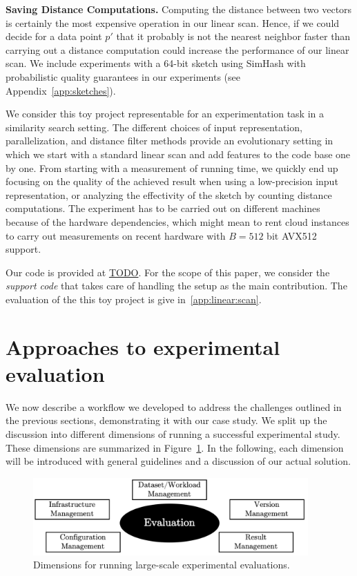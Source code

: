 \documentclass{llncs}
\newcommand{\myparagraph}[1]{\noindent \textbf{#1}}
\begin{document}
\myparagraph{Saving Distance Computations.} Computing the distance 
between two vectors is certainly the most expensive operation in our linear scan. 
Hence, if we could decide for a data point $p'$ that it probably is not the nearest neighbor faster than carrying out a distance computation could increase the performance of our linear scan. 
We include experiments with a 64-bit sketch using SimHash with probabilistic quality guarantees in our experiments (see Appendix~\ref{app:sketches}).

\medskip

We consider this toy project representable for an experimentation task in a similarity search setting. 
The different choices of input representation, parallelization, and distance filter methods provide an evolutionary setting in which we start with a standard linear scan and add features to the code base one by one. 
From starting with a measurement of running time, we quickly end up focusing on the quality of the achieved result when using a low-precision input representation, or analyzing the effectivity of the sketch by counting distance computations.
The experiment has to be carried out on different machines because of the hardware dependencies, which might mean to rent cloud instances to carry out measurements on recent hardware with $B = 512$ bit AVX512 support. 

Our code is provided at \url{TODO}. For the scope of this paper, we consider the \emph{support code} that takes care of handling the setup as the main contribution. The evaluation of the this toy project is give in~\ref{app:linear:scan}.

\section{Approaches to experimental evaluation}
We now describe a workflow we developed to address the challenges outlined
in the previous sections, demonstrating it with our case study.
We split up the discussion into different dimensions of running 
a successful experimental study. 
These dimensions are summarized in Figure~\ref{fig:discussion}. 
In the following, each dimension will be introduced with general
guidelines and a discussion of our actual solution. 

\begin{figure}[t!]
  \centering
  \includegraphics[height=8em]{figs/discussion_points.png}
  \caption{Dimensions for running large-scale experimental evaluations.}
  \label{fig:discussion}
\end{figure}
\end{document}
